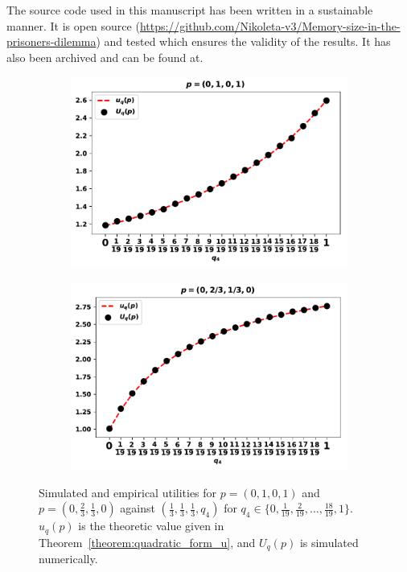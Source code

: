 \documentclass[10pt]{article}
\begin{document}
The source code used in this manuscript has been written in a sustainable manner.
It is open source (\url{https://github.com/Nikoleta-v3/Memory-size-in-the-prisoners-dilemma})
and tested which ensures the validity of the results. It has also been archived
and can be found at.

\begin{figure}[!htbp]
    \begin{center}
        \begin{subfigure}{0.45\textwidth}
            \includegraphics[width=\linewidth]{img/validation_against_player_one.pdf}
        \end{subfigure}
        \begin{subfigure}{0.45\textwidth}
            \includegraphics[width=\linewidth]{img/validation_against_player_two.pdf}
        \end{subfigure}
    \end{center}
    \caption{Simulated and empirical utilities for \(p = (0, 1, 0, 1)\)
    and \(p = (0, \frac{2}{3}, \frac{1}{3}, 0)\) against \((\frac{1}{3}, \frac{1}{3}, \frac{1}{3}, q_4)\) for
    \(q_4 \in \{0,  \frac{1}{19}, \frac{2}{19}, \dots, \frac{18}{19}, 1\}\).
    \(u_q(p)\) is the theoretic value given in Theorem~\ref{theorem:quadratic_form_u},
    and \(U_q(p)\) is simulated numerically.}
    \label{fig:analytical_simulated}
\end{figure}
\end{document}
